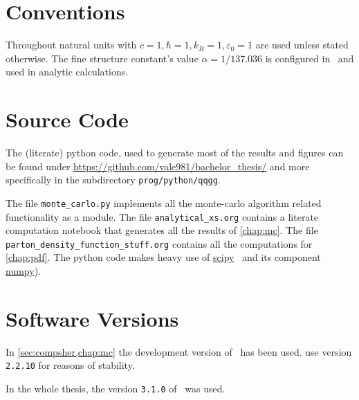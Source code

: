 \section{Conventions}%
\label{sec:convent}

Throughout natural units with
\(c=1, \hbar = 1, k_B=1, \varepsilon_0 = 1\) are used unless stated
otherwise. The fine structure constant's value \(\alpha = 1/137.036\)
is configured in \sherpa\ and used in analytic calculations.

\section{Source Code}%
\label{sec:source}

The (literate) python code, used to generate most of the results and
figures can be found under
\url{https://github.com/vale981/bachelor_thesis/} and more
specifically in the subdirectory \texttt{prog/python/qqgg}.

The file \texttt{monte\_carlo.py} implements all the monte-carlo
algorithm related functionality as a module. The file
\texttt{analytical\_xs.org} contains a literate computation notebook
that generates all the results of \cref{chap:mc}. The file
\texttt{parton\_density\_function\_stuff.org} contains all the
computations for \cref{chap:pdf}. The python code makes heavy use of
\href{https://www.scipy.org/}{scipy}~\cite{2020Virtanen:Sc} and
its component \href{https://numpy.org/}{numpy}).

\section{Software Versions}%
\label{sec:versions}

In \cref{sec:compsher,chap:mc} the development version of \sherpa\ has
been used.  use version \texttt{2.2.10} for
reasons of stability.

In the whole thesis, the version \texttt{3.1.0} of \rivet\ was used.

